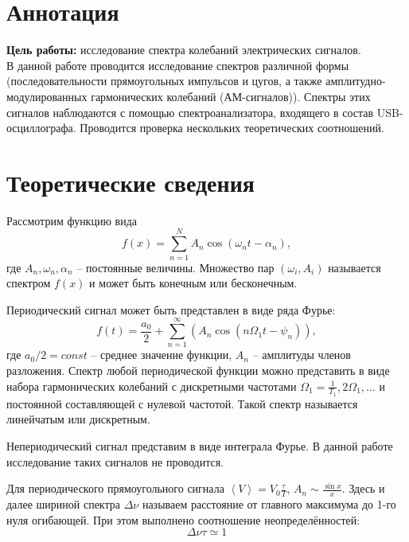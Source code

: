 \section{Аннотация}
\textbf{Цель работы:} исследование спектра колебаний электрических сигналов.\\

В данной работе проводится исследование спектров различной формы (последовательности прямоугольных импульсов и цугов, а также амплитудно-модулированных гармонических колебаний (АМ-сигналов)). Спектры этих сигналов наблюдаются с помощью спектроанализатора, входящего в состав USB-осциллографа. Проводится проверка нескольких теоретических соотношений.

\section{Теоретические сведения}

Рассмотрим функцию вида
\begin{equation*}\label{f}
	f(x) = \sum_{n=1}^{N}A_n \cos(\omega_n t -\alpha_n),
\end{equation*}
где $ A_n, \omega_n, \alpha_n $ -- постоянные величины. Множество пар $ (\omega_i, A_i) $ называется спектром $ f(x) $ и может быть конечным или бесконечным.

Периодический сигнал может быть представлен в виде ряда Фурье:
\begin{equation*}\label{key}
	f(t) = \frac{a_0}{2}+\sum_{n=1}^{\infty}(A_n \cos(n \Omega_1 t - \psi_n)),
\end{equation*}
где $ a_0/2 = const $ -- среднее значение функции, $ A_n $ -- амплитуды членов разложения. Спектр любой периодической функции можно представить в виде набора гармонических колебаний с дискретными частотами $ \Omega_1 = \frac{1}{T_1}, 2\Omega_1, \ldots $ и постоянной составляющей с нулевой частотой. Такой спектр называется линейчатым или дискретным.

Непериодический сигнал представим в виде интеграла Фурье. В данной работе исследование таких сигналов не проводится.

Для периодического прямоугольного сигнала $ \left< V \right> = V_0 \frac{\tau}{T} $, $ A_n \sim \frac{\sin x}{x} $. Здесь и далее шириной спектра $ \Delta \nu $ называем расстояние от главного максимума до 1-го нуля огибающей. При этом выполнено соотношение неопределённостей:
\begin{equation*}\label{eq:неопр}
	\Delta \nu \tau \simeq 1
\end{equation*}

